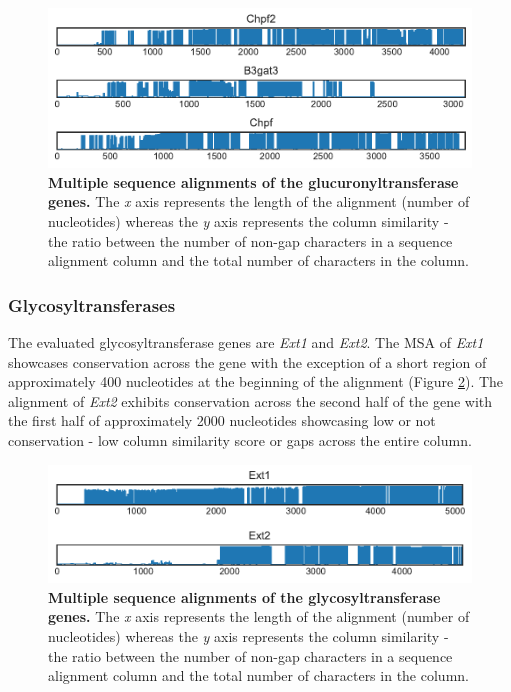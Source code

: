 \documentclass{article}
\begin{document}
\begin{figure}
\centering
\includegraphics[width=\textwidth]{./images/glucuronyltransferase_msa.pdf}
\caption{\textbf{Multiple sequence alignments of the glucuronyltransferase genes.} The \textit{x} axis represents the length of the alignment (number of nucleotides) whereas the \textit{y} axis represents the column similarity - the ratio between the number of non-gap characters in a sequence alignment column and the total number of characters in the column.}
\label{msa_fig_4}
\end{figure}

\subsubsection{Glycosyltransferases}
The evaluated glycosyltransferase genes are \textit{Ext1} and \textit{Ext2}. The MSA of \textit{Ext1} showcases conservation across the gene with the exception of a short region of approximately 400 nucleotides at the beginning of the alignment (Figure \ref{msa_fig_5}). The alignment of \textit{Ext2} exhibits conservation across the second half of the gene with the first half of approximately 2000 nucleotides showcasing low or not conservation - low column similarity score or gaps across the entire column.

\begin{figure}
\centering
\includegraphics[width=\textwidth]{./images/glycosyltransferase_msa.pdf}
\caption{\textbf{Multiple sequence alignments of the glycosyltransferase genes.} The \textit{x} axis represents the length of the alignment (number of nucleotides) whereas the \textit{y} axis represents the column similarity - the ratio between the number of non-gap characters in a sequence alignment column and the total number of characters in the column.}
\label{msa_fig_5}
\end{figure}
\end{document}
